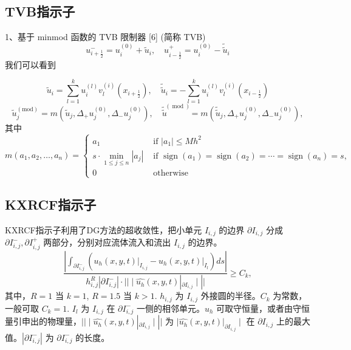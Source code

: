 \documentclass{article}
\numberwithin{equation}{subsection}    %
\begin{document}
\subsection{TVB指示子}
1、基于 minmod 函数的 TVB 限制器  [6]  (简称 TVB)
\begin{equation}
    u_{i+\frac{1}{2}}^{-}=u_{i}^{(0)}+\tilde{u}_{i}, \quad u_{i-\frac{1}{2}}^{+}=u_{i}^{(0)}-\tilde{\tilde{u}}_{i}
\end{equation}
我们可以看到

\begin{equation}
    \tilde{u}_{i}=\sum_{l=1}^{k} u_{i}^{(l)} v_{l}^{(i)}\left(x_{i+\frac{1}{2}}\right), \quad \tilde{\tilde{u}}_{i}=-\sum_{l=1}^{k} u_{i}^{(l)} v_{l}^{(i)}\left(x_{i-\frac{1}{2}}\right)
\end{equation}
\begin{equation}
    \tilde{u}_{j}^{(\mathrm{mod})}=m\left(\tilde{u}_{j}, \Delta_{+} u_{j}^{(0)}, \Delta_{-} u_{j}^{(0)}\right), \quad \tilde{\tilde{u}}^{(\bmod )}=m\left(\tilde{\tilde{u}}_{j}, \Delta_{+} u_{j}^{(0)}, \Delta_{-} u_{j}^{(0)}\right),
\end{equation}
其中
\begin{equation}
    m\left(a_{1}, a_{2}, \ldots, a_{n}\right)=\begin{cases}
        a_{1}                                             & \text { if }\left|a_{1}\right| \leq M h^{2}                                                                                              \\
        s \cdot \min _{1 \leq j \leq n}\left|a_{j}\right| & \text { if } \operatorname{sign}\left(a_{1}\right)=\operatorname{sign}\left(a_{2}\right)=\cdots=\operatorname{sign}\left(a_{n}\right)=s, \\
        0                                                 & \text { otherwise }
    \end{cases}
\end{equation}



\subsection{KXRCF指示子}
KXRCF指示子利用了DG方法的超收敛性\cite{RN92}，把小单元 $I_{i,j}$ 的边界 $\partial I_{i,j}$ 分成 $\partial I_{i,j}^-,\partial I_{i,j}^+$ 两部分，分别对应流体流入和流出 $I_{i,j}$ 的边界。
\begin{equation}
    \frac{\left|\int_{\partial I_{i, j}^{-}}\left(\left.u_{h}(x, y, t)\right|_{I_{i, j}}-\left.u_{h}(x, y, t)\right|_{I_{l}}\right) d s\right|}{h_{i, j}^{R}\left|\partial I_{i, j}^{-}\right| \cdot||\mid \widehat{u_{h}}(x, y, t)|_{\partial I_{i, j}}\mid||} \geq C_{k},
\end{equation}
其中，$R=1$ 当 $k=1$, $R=1.5$ 当 $k>1$. $h_{i,j}$ 为 $I_{i,j}$ 外接圆的半径。$C_k$ 为常数，一般可取 $C_k = 1$. $I_l$ 为 $I_{i,j}$ 在 $\partial I_{i,j}^-$ 一侧的相邻单元。$u_h$ 可取守恒量，或者由守恒量引申出的物理量，$||\mid \widehat{u_{h}}(x, y, t)|_{\partial I_{i, j}}\mid||$ 为 $\mid \widehat{u_{h}}(x, y, t)|_{\partial I_{i, j}}\mid$ 在 $\partial I_{i,j}$ 上的最大值。$|\partial I_{i,j}^-|$ 为 $\partial I_{i,j}^-$ 的长度。
\end{document}
